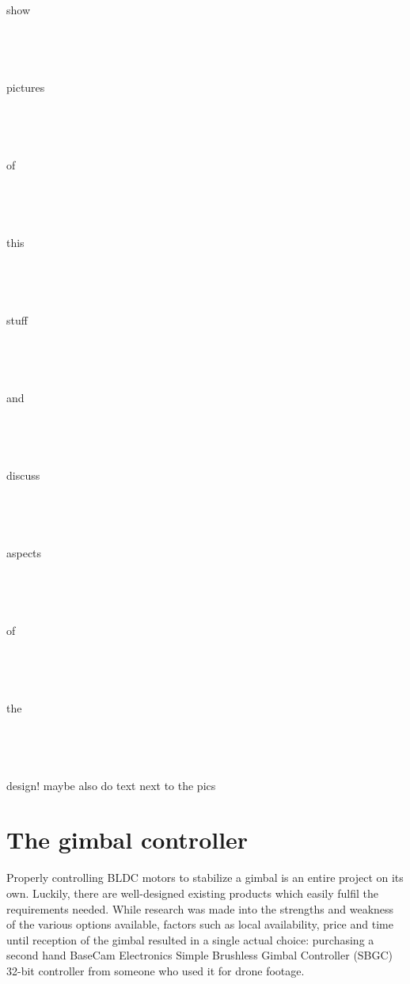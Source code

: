 {\Huge \color{red} show \\ \\ \\ \\ \\ pictures \\ \\ \\ \\ \\ of \\ \\ \\ \\ \\ this \\ \\ \\ \\ \\ stuff \\ \\ \\ \\ \\ and \\ \\ \\ \\ \\ discuss \\ \\ \\ \\ \\ aspects \\ \\ \\ \\ \\ of \\ \\ \\ \\ \\ the \\ \\ \\ \\ \\ design!}
{\color{red} maybe also do text next to the pics}



\section{The gimbal controller}
Properly controlling BLDC motors to stabilize a gimbal is an entire project on its own. Luckily, there are well-designed existing products which easily fulfil the requirements needed. While research was made into the strengths and weakness of the various options available, factors such as local availability, price and time until reception of the gimbal resulted in a single actual choice: purchasing a second hand BaseCam Electronics Simple Brushless Gimbal Controller (SBGC) 32-bit controller from someone who used it for drone footage.


